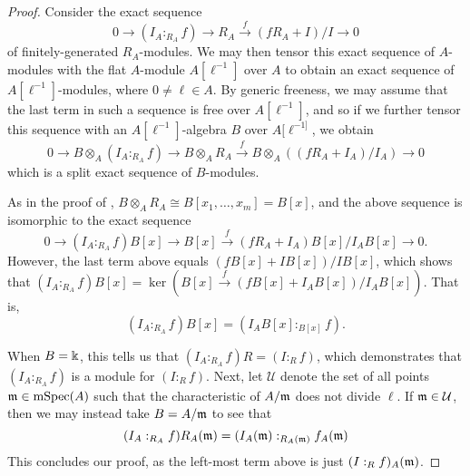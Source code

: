 \documentclass[11pt]{amsart}
\newcommand{\mspec}{\operatorname{mSpec}}
\begin{document}
\begin{proof}
Consider the exact sequence 
\[ 0 \to (I_A :_{R_A} f) \to R_A \stackrel{f}{\longrightarrow} (f R_A + I)/I \to 0 \] 
of finitely-generated $R_A$-modules.  We may then tensor this exact sequence of $A$-modules with the flat $A$-module $A[\ell^{-1}]$ over $A$ to obtain an exact sequence of $A[\ell^{-1}]$-modules, where $0 \neq \ell \in A$.  By generic freeness, we may assume that the last term in such a sequence is free over $A[\ell^{-1}]$, and so if we further tensor this sequence with an $A[\ell^{-1}]$-algebra $B$ over $A[\ell^{-1]}$, we obtain
\[ 0 \to B \otimes_A (I_A :_{R_A} f) \to B \otimes_A R_A \stackrel{f}{\longrightarrow} B \otimes_A ((f R_A + I_A)/I_A) \to 0 \] 
which is  a split exact sequence of $B$-modules.  

As in the proof of , $B \otimes_A R_A \cong B[x_1, \ldots, x_m]=B[x]$, and the above sequence is isomorphic to the exact sequence
\[ 0 \to (I_A :_{R_A} f) B[x] \to  B[x] \stackrel{f}{\longrightarrow} (f R_A + I_A)B[x]/I_AB[x] \to 0. \] 
However, the last term above equals $(fB[x] + IB[x])/IB[x]$, which shows that $(I_A:_{R_A} f)B[x]= \ker ( B[x] \stackrel{f}{\longrightarrow} (fB[x] + I_AB[x])/I_AB[x])$.  That is,
\[ (I_A:_{R_A} f)B[x] = (I_AB[x] :_{B[x]} f). \]

When $B=\Bbbk$, this tells us that $(I_A:_{R_A} f)R = (I :_{R} f)$, which demonstrates that $(I_A :_{R_A} f)$ is a module for $(I :_R f)$.  Next, let $\mathcal{U}$ denote the set of all points $\maxi \in \mspec(A)$ such that the characteristic of $A/\mathfrak{m}$ does not divide $\ell$.  If $\mathfrak{m} \in \mathcal{U}$, then we may instead take $B=A/\mathfrak{m}$ to see that 
\[  (I_A:_{R_A} f)R_A(\mathfrak{m}) = (I_A(\mathfrak{m}) :_{R_A(\mathfrak{m})} f_A(\mathfrak{m}) \]
This concludes our proof, as the left-most term above is just $(I :_R f)_A(\mathfrak{m})$.
\end{proof}
\end{document}
